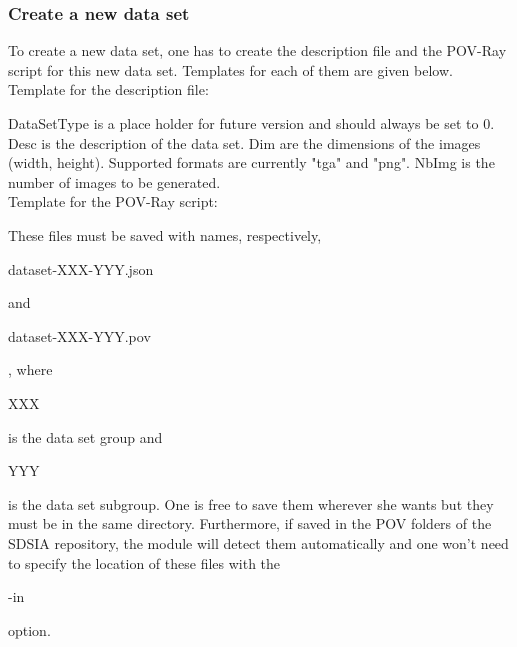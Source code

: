 \subsubsection{Create a new data set}

To create a new data set, one has to create the description file and the POV-Ray script for this new data set. Templates for each of them are given below.\\
 
Template for the description file:\\
\begin{scriptsize}
\begin{ttfamily}

\end{ttfamily}
\end{scriptsize}

DataSetType is a place holder for future version and should always be set to 0. Desc is the description of the data set. Dim are the dimensions of the images (width, height). Supported formats are currently "tga" and "png". NbImg is the number of images to be generated.\\

Template for the POV-Ray script:\\
\begin{scriptsize}
\begin{ttfamily}

\end{ttfamily}
\end{scriptsize}

These files must be saved with names, respectively, \begin{ttfamily}dataset-XXX-YYY.json\end{ttfamily} and \begin{ttfamily}dataset-XXX-YYY.pov\end{ttfamily}, where \begin{ttfamily}XXX\end{ttfamily} is the data set group and \begin{ttfamily}YYY\end{ttfamily} is the data set subgroup. One is free to save them wherever she wants but they must be in the same directory. Furthermore, if saved in the POV folders of the SDSIA repository, the module will detect them automatically and one won't need to specify the location of these files with the \begin{ttfamily}-in\end{ttfamily} option.\\

